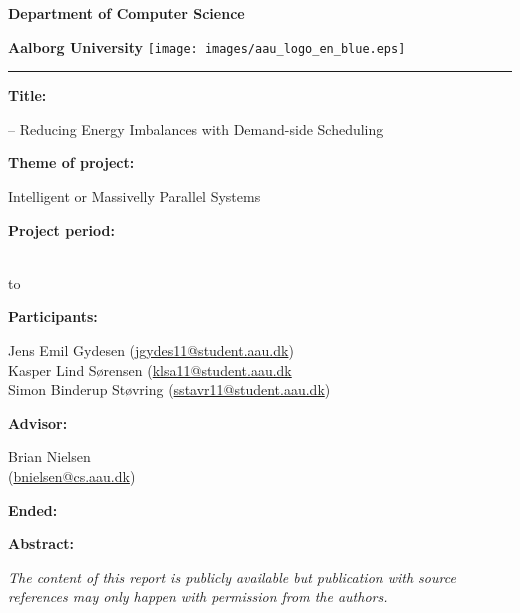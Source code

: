 \begin{nopagebreak}
  \begin{minipage}{\textwidth}
    \vspace{2cm}
    \LARGE{\textbf{Department of Computer Science}}\vspace{-2.1cm}

    \large{\textbf{Aalborg University}}
    \hspace{8cm}\texttt{[image: images/aau\_logo\_en\_blue.eps]}
  \end{minipage}
  \vspace{0.1cm}
  \hrule

  \newcommand{\titleitem}[2]{\textbf{#1:}

  \hspace*{0.5cm}
  \begin{minipage}{0.9\columnwidth}#2\end{minipage}
  \vspace{0.25cm}}
  \begin{multicols}{2}

    \titleitem{Title}{\productname{} -- Reducing Energy Imbalances with Demand-side Scheduling}

    \titleitem{Theme of project}{Intelligent or Massivelly Parallel Systems}



    \titleitem{Project period}{
      \protect\formatdate{2}{9}{2015}\\ to\\ \protect\formatdate{20}{12}{2015}
    }

    \titleitem{Participants}{
      Jens Emil Gydesen (\url{jgydes11@student.aau.dk})\\ 
      Kasper Lind Sørensen (\url{klsa11@student.aau.dk}\\
      Simon Binderup Støvring (\url{sstavr11@student.aau.dk})
    }

    \titleitem{Advisor}{Brian Nielsen\\(\url{bnielsen@cs.aau.dk})}

    \titleitem{Ended}{
      \protect{}
    }

    \vfill
    \columnbreak

    \titleitem{Abstract}{}

  \end{multicols}
  \vfill

  \begin{center}
    \textit{The content of this report is publicly available but
    publication with source references may only happen with permission from
    the authors.}
  \end{center}
\end{nopagebreak}

